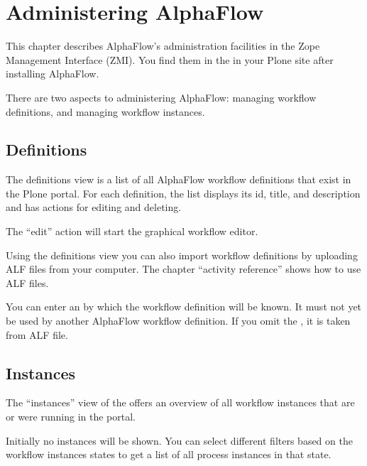 \chapter{Administering AlphaFlow}

This chapter describes AlphaFlow's administration facilities in the Zope
Management Interface (ZMI). You find them in the  
in your Plone site after installing AlphaFlow.

There are two aspects to administering AlphaFlow: managing workflow
definitions, and managing workflow instances.

\section{Definitions}

The definitions view is a list of all AlphaFlow workflow definitions that
exist in the Plone portal. For each definition, the list displays its id,
title, and description and has actions for editing and deleting. 

The ``edit'' action will start the graphical workflow editor. 

Using the definitions view  you can also import workflow definitions by
uploading ALF files from your computer. The chapter ``activity reference''
shows how to use ALF files.

You can enter an  by which the workflow definition will be known. It
must not yet be used by another AlphaFlow workflow definition. If you omit the
, it is taken from ALF file.

\section{Instances}

The ``instances'' view of the  offers an overview of
all workflow instances that are or were running in the portal.

Initially no instances will be shown. You can select different filters
based on the workflow instances states to get a list of all process instances
in that state.

